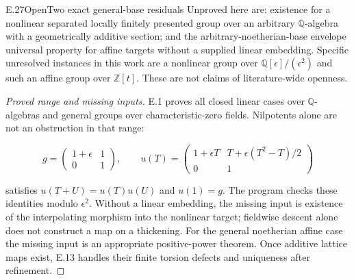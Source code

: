 \begin{statement}{E.27}{Open}{Two exact general-base residuals}
Unproved here are:
existence for a nonlinear separated locally finitely
presented group over an arbitrary $\mathbb Q$-algebra
with a geometrically additive section;
and the arbitrary-noetherian-base envelope universal
property for affine targets without a supplied linear
embedding. Specific unresolved instances in this work
are a nonlinear group over $\mathbb Q[\epsilon]/(\epsilon^2)$
and such an affine group over $\mathbb Z[t]$.
These are not claims of literature-wide openness.
\end{statement}
\begin{proof}[Proved range and missing inputs]
E.1 proves all closed linear cases over $\mathbb Q$-algebras
and general groups over characteristic-zero fields.
Nilpotents alone are not an obstruction in that range:

$$
g=\begin{pmatrix}1+\epsilon&1\\0&1\end{pmatrix},\qquad
 u(T)=\begin{pmatrix}
 1+\epsilon T&T+\epsilon(T^2-T)/2\\0&1
 \end{pmatrix}
$$

satisfies $u(T+U)=u(T)u(U)$ and $u(1)=g$.
The program checks these identities modulo $\epsilon^2$.
Without a linear embedding, the missing input is
existence of the interpolating morphism into the
nonlinear target; fieldwise descent alone does not
construct a map on a thickening.
For the general noetherian affine case the missing
input is an appropriate positive-power theorem.
Once additive lattice maps exist, E.13 handles their
finite torsion defects and uniqueness after refinement.
\end{proof}

